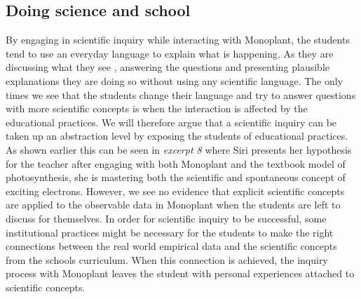\subsection{Doing science and school}
By engaging in scientific inquiry while interacting with Monoplant, the students tend to use an everyday language to explain what is happening. As they are discussing what they see , answering the questions and presenting plausible explanations they are doing so without using any scientific language. The only times we see that the students change their language and try to answer questions with more scientific concepts is when the interaction is affected by the educational practices. We will therefore argue that a scientific inquiry can be taken up an abstraction level by exposing the students of educational practices. As shown earlier this can be seen in \emph{excerpt 8} where Siri presents her hypothesis for the teacher after engaging with both Monoplant and the textbook model of photosynthesis, she is mastering both the scientific and spontaneous concept of exciting electrons. However, we see no evidence that explicit scientific concepts are applied to the observable data in Monoplant when the students are left to discuss for themselves. 
In order for scientific inquiry to be successful, some institutional practices might be necessary for the students to make the right connections between the real world empirical data and the scientific concepts from the schools curriculum. When this connection is achieved, the inquiry process with Monoplant leaves the student with personal experiences attached to scientific concepts. 

 



